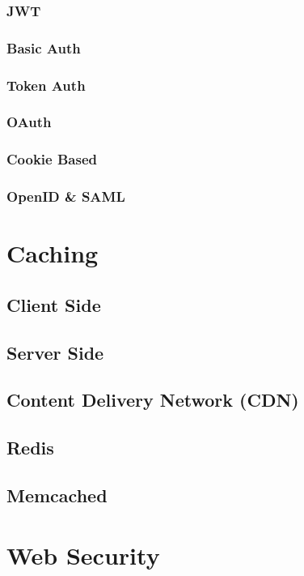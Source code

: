 \documentclass[a4paper]{article}
\begin{document}
    \subsubsection{JWT}
    \subsubsection{Basic Auth}
    \subsubsection{Token Auth}
    \subsubsection{OAuth}
    \subsubsection{Cookie Based}
    \subsubsection{OpenID \& SAML}

    

    \newpage
    \section{Caching}
    \subsection{Client Side}
    \subsection{Server Side}
    \subsection{Content Delivery Network (CDN)}
    \subsection{Redis}
    \subsection{Memcached}

    \newpage
    \section{Web Security}
\end{document}
